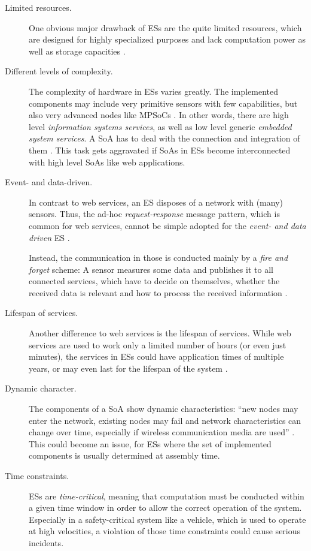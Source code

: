 \begin{description}
\item [Limited resources.]
One obvious major drawback of ESs are the quite limited resources, which are designed for highly specialized purposes and lack computation power as well as storage capacities \cite{rodrigues2011} \cite{scholz} \cite{sommer}.

\item [Different levels of complexity.]
The complexity of hardware in ESs varies greatly. The implemented components may include very primitive sensors with few capabilities, but also very advanced nodes like MPSoCs \cite{scholz} \cite{sommer}. In other words, there are high level \emph{information systems services}, as well as low level generic \emph{embedded system services}. A SoA has to deal with the connection and integration of them \cite{rodrigues2011}. This task gets aggravated if SoAs in ESs become interconnected with high level SoAs like web applications.

\item [Event- and data-driven.]
In contrast to web services, an ES disposes of a network with (many) sensors. Thus, the ad-hoc \emph{request-response} message pattern, which is common for web services, cannot be simple adopted for the \emph{event- and data driven} ES \cite{sommer}.

Instead, the communication in those is conducted mainly by a \emph{fire and forget} scheme: A sensor measures some data and publishes it to all connected services, which have to decide on themselves, whether the received data is relevant and how to process the received information \cite{sommer}.

\item [Lifespan of services.]
Another difference to web services is the lifespan of services. While web services are used to work only a limited number of hours (or even just minutes), the services in ESs could have application times of multiple years, or may even last for the lifespan of the system \cite{buckl}.

\item [Dynamic character.] 
The components of a SoA show dynamic characteristics: ``new nodes may enter the network, existing nodes may fail and network characteristics can change over time, especially if wireless communication media are used'' \cite{sommer}. This could become an issue, for ESs where the set of implemented components is usually determined at assembly time.

\item [Time constraints.]
ESs are \emph{time-critical}, meaning that computation must be conducted within a given time window in order to allow the correct operation of the system. Especially in a safety-critical system like a vehicle, which is used to operate at high velocities, a violation of those time constraints could cause serious incidents.
\end{description}

